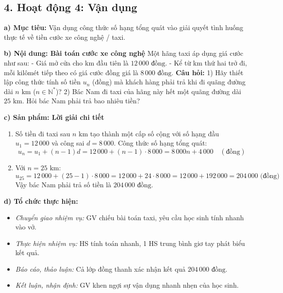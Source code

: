 \documentclass[12pt, a4paper]{article}
\begin{document}
\subsection*{4. Hoạt động 4: Vận dụng}  
  
\noindent \textbf{a) Mục tiêu:}  
Vận dụng công thức số hạng tổng quát vào giải quyết tình huống thực tế về tiền cước xe công nghệ / taxi.  
  
\noindent \textbf{b) Nội dung: Bài toán cước xe công nghệ}  
Một hãng taxi áp dụng giá cước như sau:  
- Giá mở cửa cho km đầu tiên là $12\,000\text{ đồng}$.  
- Kể từ km thứ hai trở đi, mỗi kilômét tiếp theo có giá cước đồng giá là $8\,000\text{ đồng}$.  
\textbf{Câu hỏi:}  
1) Hãy thiết lập công thức tính số tiền $u_n$ (đồng) mà khách hàng phải trả khi đi quãng đường dài $n\text{ km}$ ($n \in \mathbb{N}^*$)?  
2) Bác Nam đi taxi của hãng này hết một quãng đường dài $25\text{ km}$. Hỏi bác Nam phải trả bao nhiêu tiền?  
  
\noindent \textbf{c) Sản phẩm: Lời giải chi tiết}  
\begin{enumerate}[leftmargin=0.6cm]  
    \item Số tiền đi taxi sau $n\text{ km}$ tạo thành một cấp số cộng với số hạng đầu $u_1 = 12\,000$ và công sai $d = 8\,000$.  
    Công thức số hạng tổng quát:  
    $$u_n = u_1 + (n - 1)d = 12\,000 + (n - 1) \cdot 8\,000 = 8\,000n + 4\,000 \quad (\text{đồng})$$  
    \item Với $n = 25\text{ km}$:  
    $$u_{25} = 12\,000 + (25 - 1) \cdot 8\,000 = 12\,000 + 24 \cdot 8\,000 = 12\,000 + 192\,000 = 204\,000\text{ (đồng)}$$  
    Vậy bác Nam phải trả số tiền là $204\,000\text{ đồng}$.  
\end{enumerate}  
  
\noindent \textbf{d) Tổ chức thực hiện:}  
\begin{itemize}[leftmargin=0.8cm]  
    \item \textit{Chuyển giao nhiệm vụ:} GV chiếu bài toán taxi, yêu cầu học sinh tính nhanh vào vở.  
    \item \textit{Thực hiện nhiệm vụ:} HS tính toán nhanh, 1 HS trung bình giơ tay phát biểu kết quả.  
    \item \textit{Báo cáo, thảo luận:} Cả lớp đồng thanh xác nhận kết quả $204\,000\text{ đồng}$.  
    \item \textit{Kết luận, nhận định:} GV khen ngợi sự vận dụng nhanh nhẹn của học sinh.  
\end{itemize}  
  
\end{document}
